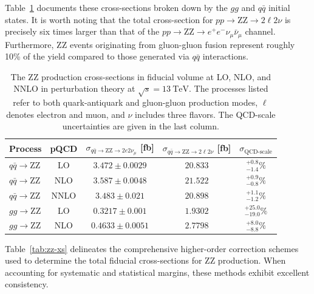 Table~\ref{tab:zz-prod} documents these cross-sections broken down by the $gg$ and $q\bar{q}$ initial states. It is worth noting that the total cross-section for $pp \rightarrow \text{ZZ} \rightarrow 2\ell 2\nu$ is precisely six times larger than that of the $pp \rightarrow \text{ZZ} \rightarrow e^+e^- \nu_\mu \bar{\nu}_\mu $ channel. Furthermore, $\text{ZZ}$ events originating from gluon-gluon fusion represent roughly 10\% of the yield compared to those generated via $q\bar{q}$ interactions.

\begin{table}[htbp]
\centering
\begin{tabular}{|l|c|c|c|c|}
\hline
\textbf{Process} & \textbf{pQCD} & \textbf{$\sigma_{q\bar{q} \rightarrow \text{ZZ} \rightarrow 2e 2\nu_\mu }$ [fb]} & \textbf{$\sigma_{q\bar{q} \rightarrow \text{ZZ} \rightarrow 2\ell 2\nu}$ [fb]} &  \textbf{$\sigma_{\text{QCD-scale}}$} \\ \hline
 $q\bar{q} \rightarrow \text{ZZ}$ & LO  & $3.472 \pm 0.0029$ & $20.833$ & $^{+0.8}_{-1.4}\%$ \\ \hline 
 $q\bar{q} \rightarrow \text{ZZ}$ & NLO  & $3.587 \pm 0.0048$ & $21.522$ & $^{+0.9}_{-0.8}\%$ \\ \hline 
 $q\bar{q} \rightarrow \text{ZZ}$ & NNLO  & $3.483 \pm 0.021$ & $20.898$ & $^{+1.1}_{-1.2}\%$ \\ \hline \hline
 $gg \rightarrow \text{ZZ}$ & LO  & $0.3217 \pm 0.001$ & $1.9302$ & $^{+25.0}_{-19.0}\%$ \\ \hline 
 $gg \rightarrow \text{ZZ}$ & NLO  & $0.4633 \pm 0.0051$ & $2.7798$  & $^{+8.0}_{-8.8}\%$ \\ \hline 
\end{tabular}
\caption{The $\text{ZZ}$ production cross-sections in fiducial volume at LO, NLO, and NNLO in perturbation theory at $\sqrt{s} = 13~\text{TeV}$. 
The processes listed refer to both quark-antiquark and gluon-gluon production modes, $\ell$ denotes electron and muon, and $\nu$ includes three flavors. The QCD-scale uncertainties are given in the last column.}
\label{tab:zz-prod}
\end{table}

Table~\ref{tab:zz-xs} delineates the comprehensive higher-order correction schemes used to determine the total fiducial cross-sections for $\text{ZZ}$ production. When accounting for systematic and statistical margins, these methods exhibit excellent consistency.

